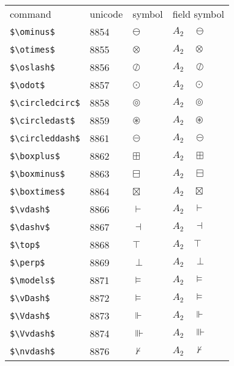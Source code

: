 \documentclass{article}
\begin{document}
\begin{table}
\begin{center}
\begin{tabular}{llll}
 command                    & unicode & symbol              & field symbol\\
 \verb#$\ominus$#           & 8854    & $\ominus$           & $A_2\quad \ominus$\\
 \verb#$\otimes$#           & 8855    & $\otimes$           & $A_2\quad \otimes$\\
 \verb#$\oslash$#           & 8856    & $\oslash$           & $A_2\quad \oslash$\\
 \verb#$\odot$#             & 8857    & $\odot$             & $A_2\quad \odot$\\
 \verb#$\circledcirc$#      & 8858    & $\circledcirc$      & $A_2\quad \circledcirc$\\
 \verb#$\circledast$#       & 8859    & $\circledast$       & $A_2\quad \circledast$\\
 \verb#$\circleddash$#      & 8861    & $\circleddash$      & $A_2\quad \circleddash$\\
 \verb#$\boxplus$#          & 8862    & $\boxplus$          & $A_2\quad \boxplus$\\
 \verb#$\boxminus$#         & 8863    & $\boxminus$         & $A_2\quad \boxminus$\\
 \verb#$\boxtimes$#         & 8864    & $\boxtimes$         & $A_2\quad \boxtimes$\\
 \verb#$\vdash$#            & 8866    & $\vdash$            & $A_2\quad \vdash$\\
 \verb#$\dashv$#            & 8867    & $\dashv$            & $A_2\quad \dashv$\\
 \verb#$\top$#              & 8868    & $\top$              & $A_2\quad \top$\\
 \verb#$\perp$#             & 8869    & $\perp$             & $A_2\quad \perp$\\
 \verb#$\models$#           & 8871    & $\models$           & $A_2\quad \models$\\
 \verb#$\vDash$#            & 8872    & $\vDash$            & $A_2\quad \vDash$\\
 \verb#$\Vdash$#            & 8873    & $\Vdash$            & $A_2\quad \Vdash$\\
 \verb#$\Vvdash$#           & 8874    & $\Vvdash$           & $A_2\quad \Vvdash$\\
 \verb#$\nvdash$#           & 8876    & $\nvdash$           & $A_2\quad \nvdash$\\

\end{tabular}
\end{center}
\end{table}
\end{document}
